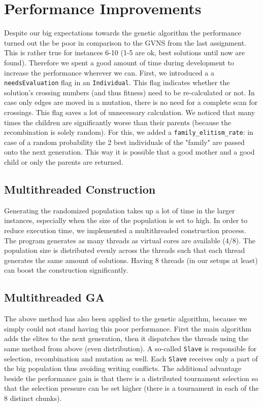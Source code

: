 \documentclass[11pt]{article}
\begin{document}
\section{Performance Improvements}
\hspace{0.5cm}Despite our big expectations towards the genetic algorithm the performance turned out the be poor in comparison to the GVNS from the last assignment. This is rather true for instances 6-10 (1-5 are ok, best solutions until now are found). Therefore we spent a good amount of time during development to increase the performance wherever we can. First, we introduced a a \texttt{needsEvaluation} flag in an \texttt{Individual}. This flag indicates whether the solution's crossing numbers (and thus fitness) need to be re-calculated or not. In case only edges are moved in a mutation, there is no need for a complete scan for crossings. This flag saves a lot of unnecessary calculation. We noticed that many times the children are significantly worse than their parents (because the recombination is solely random). For this, we added a \texttt{family\_elitism\_rate}: in case of a random probability the 2 best individuals of the "family" are passed onto the next generation. This way it is possible that a good mother and a good child or only the parents are returned.

\subsection{Multithreaded Construction}
\hspace{0.5cm}Generating the randomized population takes up a lot of time in the larger instances, especially when the size of the population is set to high. In order to reduce execution time, we implemented a multithreaded construction process. The program generates as many threads as virtual cores are available (4/8). The population size is distributed evenly across the threads such that each thread generates the same amount of solutions. Having 8 threads (in our setups at least) can boost the construction significantly. 
\subsection{Multithreaded GA}
\hspace{0.5cm}The above method has also been applied to the genetic algorithm, because we simply could not stand having this poor performance. First the main algorithm adds the elites to the next generation, then it dispatches the threads using the same method from above (even distribution). A so-called \texttt{Slave} is responsible for selection, recombination and mutation as well. Each \texttt{Slave} receives only a part of the big population thus avoiding writing conflicts. The additional advantage beside the performance gain is that there is a distributed tournament selection so that the selection pressure can be set higher (there is a tournament in each of the 8 distinct chunks).
\end{document}
